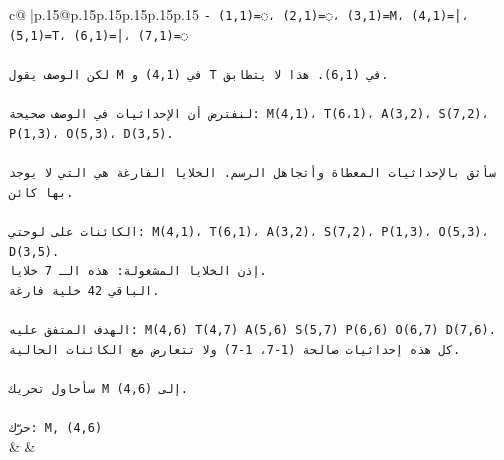 \documentclass{article}
\begin{document}
{\begin{supertabular}{c@{$\;$}|p{.15\linewidth}@{}p{.15\linewidth}p{.15\linewidth}p{.15\linewidth}p{.15\linewidth}p{.15\linewidth}}
{{{\texttt{{-} (1,1)=◌، (2,1)=◌، (3,1)=M، (4,1)=│، (5,1)=T، (6,1)=│، (7,1)=◌} \\
\\ 
\texttt{لكن الوصف يقول M في (4,1) و T في (6,1). هذا لا يتطابق.} \\
\\ 
\texttt{لنفترض أن الإحداثيات في الوصف صحيحة: M(4,1)، T(6،1)، A(3,2)، S(7,2)، P(1,3)، O(5,3)، D(3,5).} \\
\\ 
\texttt{سأثق بالإحداثيات المعطاة وأتجاهل الرسم. الخلايا الفارغة هي التي لا يوجد بها كائن.} \\
\\ 
\texttt{الكائنات على لوحتي: M(4,1)، T(6,1)، A(3,2)، S(7,2)، P(1,3)، O(5,3)، D(3,5).} \\
\texttt{إذن الخلايا المشغولة: هذه الـ 7 خلايا.} \\
\texttt{الباقي 42 خلية فارغة.} \\
\\ 
\texttt{الهدف المتفق عليه: M(4,6) T(4,7) A(5,6) S(5,7) P(6,6) O(6,7) D(7,6).} \\
\texttt{كل هذه إحداثيات صالحة (1{-}7، 1{-}7) ولا تتعارض مع الكائنات الحالية.} \\
\\ 
\texttt{سأحاول تحريك M إلى (4,6).} \\
\\ 
\texttt{حرّك: M, (4,6)} \\
            }
        }
    }
    & & \\ \\


\end{supertabular}}
\end{document}
